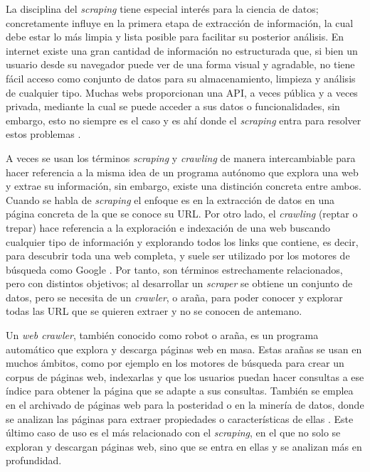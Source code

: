 La disciplina del \textit{scraping} tiene especial interés para la ciencia de
datos; concretamente influye en la primera etapa de extracción de información,
la cual debe estar lo más limpia y lista posible para facilitar su posterior
análisis. En internet existe una gran cantidad de información no estructurada
que, si bien un usuario desde su navegador puede ver de una forma visual y
agradable, no tiene fácil acceso como conjunto de datos para su almacenamiento,
limpieza y análisis de cualquier tipo. Muchas webs proporcionan una API, a veces
pública y a veces privada, mediante la cual se puede acceder a sus datos o
funcionalidades, sin embargo, esto no siempre es el caso y es ahí donde el
\textit{scraping} entra para resolver estos problemas \cite{apress2018scraping}.

A veces se usan los términos \textit{scraping} y \textit{crawling} de manera
intercambiable para hacer referencia a la misma idea de un programa autónomo que
explora una web y extrae su información, sin embargo, existe una distinción
concreta entre ambos. Cuando se habla de \textit{scraping} el enfoque es en la
extracción de datos en una página concreta de la que se conoce su URL. Por otro
lado, el \textit{crawling} (reptar o trepar) hace referencia a la exploración e
indexación de una web buscando cualquier tipo de información y explorando todos
los links que contiene, es decir, para descubrir toda una web completa, y suele
ser utilizado por los motores de búsqueda como Google \cite{scrapingvscrawling}.
Por tanto, son términos estrechamente relacionados, pero con distintos
objetivos; al desarrollar un \textit{scraper} se obtiene un conjunto de datos,
pero se necesita de un \textit{crawler}, o araña, para poder conocer y explorar
todas las URL que se quieren extraer y no se conocen de antemano.

Un \textit{web crawler}, también conocido como robot o araña, es un programa
automático que explora y descarga páginas web en masa. Estas arañas se usan en
muchos ámbitos, como por ejemplo en los motores de búsqueda para crear un corpus
de páginas web, indexarlas y que los usuarios puedan hacer consultas a ese
índice para obtener la página que se adapte a sus consultas. También se emplea
en el archivado de páginas web para la posteridad o en la minería de datos,
donde se analizan las páginas para extraer propiedades o características de
ellas \cite{olston2010web}. Este último caso de uso es el más relacionado con el
\textit{scraping}, en el que no solo se exploran y descargan páginas web, sino
que se entra en ellas y se analizan más en profundidad.

